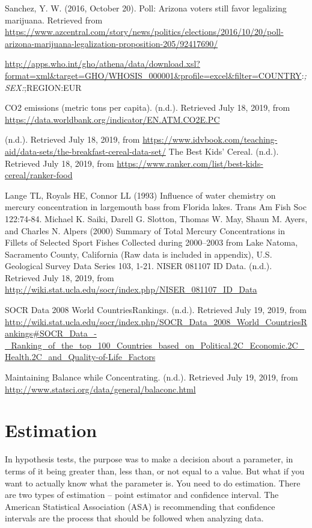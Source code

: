 \documentclass[
]{book}
\begin{document}
Sanchez, Y. W. (2016, October 20). Poll: Arizona voters still favor legalizing marijuana. Retrieved from \url{https://www.azcentral.com/story/news/politics/elections/2016/10/20/poll-arizona-marijuana-legalization-proposition-205/92417690/}

\url{http://apps.who.int/gho/athena/data/download.xsl?format=xml\&target=GHO/WHOSIS_000001\&profile=excel\&filter=COUNTRY}:\emph{;SEX:};REGION:EUR

CO2 emissions (metric tons per capita). (n.d.). Retrieved July 18, 2019, from \url{https://data.worldbank.org/indicator/EN.ATM.CO2E.PC}

(n.d.). Retrieved July 18, 2019, from \url{https://www.idvbook.com/teaching-aid/data-sets/the-breakfast-cereal-data-set/}
The Best Kids' Cereal. (n.d.). Retrieved July 18, 2019, from \url{https://www.ranker.com/list/best-kids-cereal/ranker-food}

Lange TL, Royals HE, Connor LL (1993) Influence of water chemistry on mercury concentration in largemouth bass from Florida lakes. Trans Am Fish Soc 122:74-84.
Michael K. Saiki, Darell G. Slotton, Thomas W. May, Shaun M. Ayers, and Charles N. Alpers (2000) Summary of Total Mercury Concentrations in Fillets of Selected Sport Fishes Collected during 2000--2003 from Lake Natoma, Sacramento County, California (Raw data is included in appendix), U.S. Geological Survey Data Series 103, 1-21.
NISER 081107 ID Data. (n.d.). Retrieved July 18, 2019, from \url{http://wiki.stat.ucla.edu/socr/index.php/NISER_081107_ID_Data}

SOCR Data 2008 World CountriesRankings. (n.d.). Retrieved July 19, 2019, from \url{http://wiki.stat.ucla.edu/socr/index.php/SOCR_Data_2008_World_CountriesRankings\#SOCR_Data_-_Ranking_of_the_top_100_Countries_based_on_Political.2C_Economic.2C_Health.2C_and_Quality-of-Life_Factors}

Maintaining Balance while Concentrating. (n.d.). Retrieved July 19, 2019, from \url{http://www.statsci.org/data/general/balaconc.html}

\hypertarget{estimation}{%
\chapter{Estimation}\label{estimation}}

In hypothesis tests, the purpose was to make a decision about a parameter, in terms of it being greater than, less than, or not equal to a value. But what if you want to actually know what the parameter is. You need to do estimation. There are two types of estimation -- point estimator and confidence interval. The American Statistical Association (ASA) is recommending that confidence intervals are the process that should be followed when analyzing data.
\end{document}
